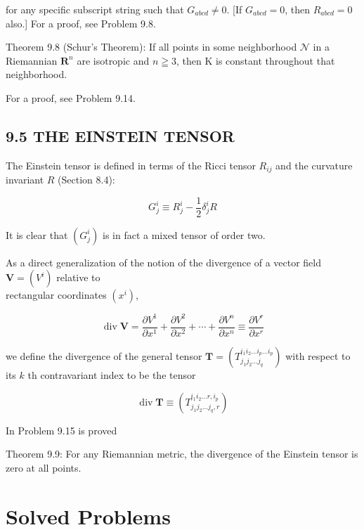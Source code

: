 \documentclass[10pt]{article}
\begin{document}
for any specific subscript string such that $G_{a b c d} \neq 0$. [If $G_{a b c d}=0$, then $R_{a b c d}=0$ also.] For a proof, see Problem 9.8.

Theorem 9.8 (Schur's Theorem): If all points in some neighborhood $\mathcal{N}$ in a Riemannian $\mathbf{R}^{n}$ are isotropic and $n \geqq 3$, then $\mathrm{K}$ is constant throughout that neighborhood.

For a proof, see Problem 9.14.

\subsection*{9.5 THE EINSTEIN TENSOR}
The Einstein tensor is defined in terms of the Ricci tensor $R_{i j}$ and the curvature invariant $R$ (Section 8.4):


\begin{equation*}
G_{j}^{i} \equiv R_{j}^{i}-\frac{1}{2} \delta_{j}^{i} R \tag{9.10}
\end{equation*}


It is clear that $\left(G_{j}^{i}\right)$ is in fact a mixed tensor of order two.

As a direct generalization of the notion of the divergence of a vector field $\mathbf{V}=\left(V^{i}\right)$ relative to\\
rectangular coordinates $\left(x^{i}\right)$,

$$
\operatorname{div} \mathbf{V}=\frac{\partial V^{1}}{\partial x^{1}}+\frac{\partial V^{2}}{\partial x^{2}}+\cdots+\frac{\partial V^{n}}{\partial x^{n}} \equiv \frac{\partial V^{r}}{\partial x^{r}}
$$

we define the divergence of the general tensor $\mathbf{T}=\left(T_{j_{1} j_{2} \ldots j_{q}}^{i_{1} i_{2} \ldots i_{p} \ldots i_{p}}\right)$ with respect to its $k$ th contravariant index to be the tensor


\begin{equation*}
\operatorname{div} \mathbf{T} \equiv\left(T_{j_{1} j_{2} \ldots j_{q}, r}^{i_{1} i_{2} \ldots r, i_{p}}\right) \tag{9.11}
\end{equation*}


In Problem 9.15 is proved

Theorem 9.9: For any Riemannian metric, the divergence of the Einstein tensor is zero at all points.

\section*{Solved Problems}
\end{document}
